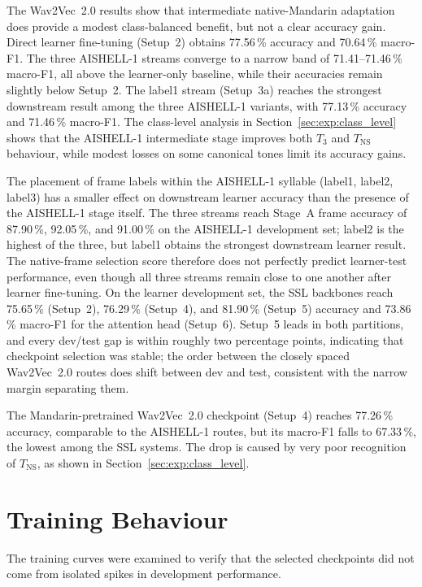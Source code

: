 The Wav2Vec~2.0 results show that intermediate native-Mandarin adaptation does
provide a modest class-balanced benefit, but not a clear accuracy gain. Direct
learner fine-tuning (Setup~2) obtains 77.56\,\% accuracy and 70.64\,\%
macro-F1. The three AISHELL-1 streams converge to a narrow band of
71.41--71.46\,\% macro-F1, all above the learner-only baseline, while their
accuracies remain slightly below Setup~2. The label1 stream (Setup~3a) reaches
the strongest downstream result among the three AISHELL-1 variants, with
77.13\,\% accuracy and 71.46\,\% macro-F1. The class-level analysis in
Section~\ref{sec:exp:class_level} shows that the AISHELL-1 intermediate stage
improves both \(T_3\) and \(T_{\mathrm{NS}}\) behaviour, while modest losses on
some canonical tones limit its accuracy gains.

The placement of frame labels within the AISHELL-1 syllable (label1, label2,
label3) has a smaller effect on downstream learner accuracy than the presence
of the AISHELL-1 stage itself. The three streams reach Stage~A frame accuracy
of 87.90\,\%, 92.05\,\%, and 91.00\,\% on the AISHELL-1 development set;
label2 is the highest of the three, but label1 obtains the strongest
downstream learner result. The native-frame selection score therefore does not
perfectly predict learner-test performance, even though all three streams remain
close to one another after learner fine-tuning. On the learner development set,
the SSL backbones reach 75.65\,\% (Setup~2), 76.29\,\% (Setup~4), and 81.90\,\%
(Setup~5) accuracy and 73.86\,\% macro-F1 for the attention head (Setup~6).
Setup~5 leads in both partitions, and every dev/test gap is within roughly
two percentage points, indicating that checkpoint selection was stable; the
order between the closely spaced Wav2Vec~2.0 routes does shift between dev
and test, consistent with the narrow margin separating them.

The Mandarin-pretrained Wav2Vec~2.0 checkpoint (Setup~4) reaches 77.26\,\%
accuracy, comparable to the AISHELL-1 routes, but its macro-F1 falls to
67.33\,\%, the lowest among the SSL systems. The drop is caused by very poor
recognition of \(T_{\mathrm{NS}}\), as shown in
Section~\ref{sec:exp:class_level}.

\section{Training Behaviour}
\label{sec:exp:curves}

The training curves were examined to verify that the selected checkpoints did
not come from isolated spikes in development performance.

